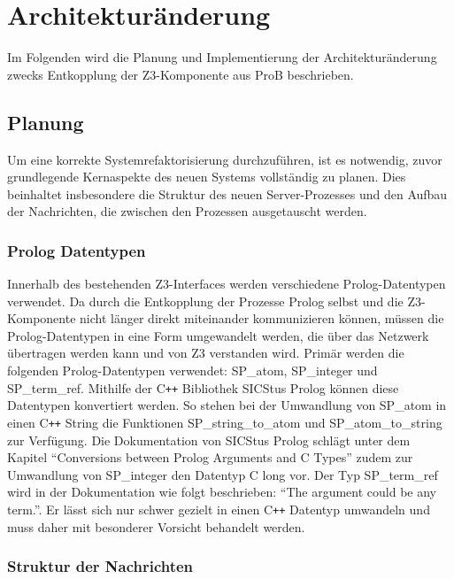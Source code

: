 


\section{Architekturänderung}

Im Folgenden wird die Planung und Implementierung der Architekturänderung zwecks Entkopplung der Z3-Komponente aus ProB beschrieben.

\subsection{Planung}

Um eine korrekte Systemrefaktorisierung durchzuführen, ist es notwendig, zuvor grundlegende Kernaspekte
des neuen Systems vollständig zu planen. Dies beinhaltet insbesondere die Struktur des neuen Server-Prozesses
und den Aufbau der Nachrichten, die zwischen den Prozessen ausgetauscht werden.

\subsubsection{Prolog Datentypen}

Innerhalb des bestehenden Z3-Interfaces werden verschiedene Prolog-Datentypen verwendet.
Da durch die Entkopplung der Prozesse Prolog selbst und die Z3-Komponente nicht länger direkt miteinander kommunizieren können,
müssen die Prolog-Datentypen in eine Form umgewandelt werden, die über das Netzwerk übertragen werden kann und von Z3 verstanden wird.
Primär werden die folgenden Prolog-Datentypen verwendet: SP\_atom, SP\_integer und SP\_term\_ref.
Mithilfe der C\texttt{++} Bibliothek SICStus Prolog können diese Datentypen konvertiert werden.
So stehen bei der Umwandlung von SP\_atom in einen C\texttt{++} String die Funktionen SP\_string\_to\_atom und SP\_atom\_to\_string zur Verfügung.
Die Dokumentation von SICStus Prolog \cite{sicstusdoc} schlägt unter dem Kapitel \enquote{Conversions between Prolog Arguments and C Types} zudem zur Umwandlung von SP\_integer den Datentyp C long vor.
Der Typ SP\_term\_ref wird in der Dokumentation wie folgt beschrieben: \enquote{The argument could be any term.}.
Er lässt sich nur schwer gezielt in einen C\texttt{++} Datentyp umwandeln und muss daher mit besonderer Vorsicht behandelt werden.

\subsubsection{Struktur der Nachrichten}

